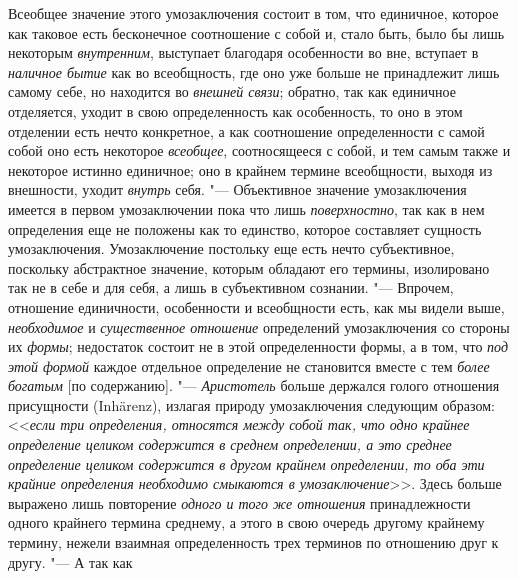 {{Всеобщее значение этого умозаключения состоит в том, что
единичное, которое как таковое есть бесконечное соотношение с собой и,
стало быть, было бы лишь некоторым
{\em внутренним},
выступает благодаря особенности во вне, вступает в
{\em наличное бытие} как
во всеобщность, где оно уже больше не принадлежит лишь самому себе, но
находится во {\em внешней связи};
обратно, так как единичное отделяется, уходит в свою
определенность как особенность, то оно в этом отделении есть
нечто конкретное, а как соотношение определенности с самой собой оно есть
некоторое {\em всеобщее},
соотносящееся с собой, и тем самым также и некоторое истинно
единичное; оно в крайнем термине всеобщности, выходя из внешности, уходит
{\em внутрь} себя. "---
Объективное значение умозаключения имеется в первом
умозаключении пока что лишь
{\em поверхностно}, так
как в нем определения еще не положены как то единство, которое составляет
сущность умозаключения. Умозаключение постольку еще есть нечто
субъективное, поскольку абстрактное значение, которым обладают его термины,
изолировано так не в себе и для себя, а лишь в субъективном сознании. "---
Впрочем, отношение единичности, особенности и всеобщности
есть, как мы видели выше,
{\em необходимое} и
{\em существенное отношение}
определений умозаключения со стороны их
{\em формы}; недостаток
состоит не в этой определенности формы, а в том, что
{\em под этой формой}
каждое отдельное определение не становится вместе с тем
{\em более богатым} [по
содержанию]. "--- {\em Аристотель}
больше держался голого отношения присущности (Inhärenz),
излагая природу умозаключения следующим образом:
<<{\em если три определения, относятся
между собой так, что одно крайнее определение целиком содержится в среднем
определении, а это среднее определение целиком содержится в другом крайнем
определении, то оба эти крайние определения необходимо смыкаются в
умозаключение}>>.
Здесь больше выражено лишь повторение
{\em одного и того же отношения}
принадлежности одного крайнего термина среднему, а этого в
свою очередь другому крайнему термину, нежели взаимная определенность трех
терминов по отношению друг к другу. "--- А так как
}}
